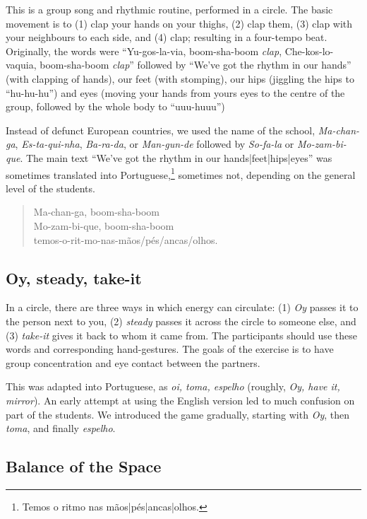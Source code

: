 \documentclass[article,twocolumn,twoside]{memoir}
\begin{document}
This is a group song and rhythmic routine, performed in a circle. The basic
movement is to (1) clap your hands on your thighs, (2) clap them, (3) clap with
your neighbours to each side, and (4) clap; resulting in a four-tempo beat.
Originally, the words were ``Yu-gos-la-via, boom-sha-boom \textit{clap},
Che-kos-lo-vaquia, boom-sha-boom \textit{clap}'' followed by ``We've got the
rhythm in our hands'' (with clapping of hands), our feet (with stomping), our
hips (jiggling the hips to ``hu-hu-hu'') and eyes (moving your hands from yours
eyes to the centre of the group, followed by the whole body to ``uuu-huuu'')

Instead of defunct European countries, we used the name of the school,
\textit{Ma-chan-ga}, \textit{Es-ta-qui-nha}, \textit{Ba-ra-da}, or
\textit{Man-gun-de} followed by \textit{So-fa-la} or \textit{Mo-zam-bi-que}.
The main text ``We've got the rhythm in our hands|feet|hips|eyes'' was
sometimes translated into Portuguese,\footnote{Temos o ritmo nas
mãos|pés|ancas|olhos.} sometimes not, depending on the general level of the
students.

\begin{verse}
Ma-chan-ga, boom-sha-boom\\
Mo-zam-bi-que, boom-sha-boom\\
temos-o-rit-mo-nas-mãos/pés/ancas/olhos.
\end{verse}


\subsection{Oy, steady, take-it}
In a circle, there are three ways in which energy can circulate: (1)
\textit{Oy} passes it to the person next to you, (2) \textit{steady} passes it
across the circle to someone else, and (3) \textit{take-it} gives it back to
whom it came from. The participants should use these words and corresponding
hand-gestures. The goals of the exercise is to have group concentration and eye
contact between the partners.

This was adapted into Portuguese, as \textit{oi, toma, espelho} (roughly,
\textit{Oy, have it, mirror}). An early attempt at using the English version
led to much confusion on part of the students. We introduced the game
gradually, starting with \textit{Oy}, then \textit{toma}, and finally
\textit{espelho}.

\subsection{Balance of the Space}
\end{document}
